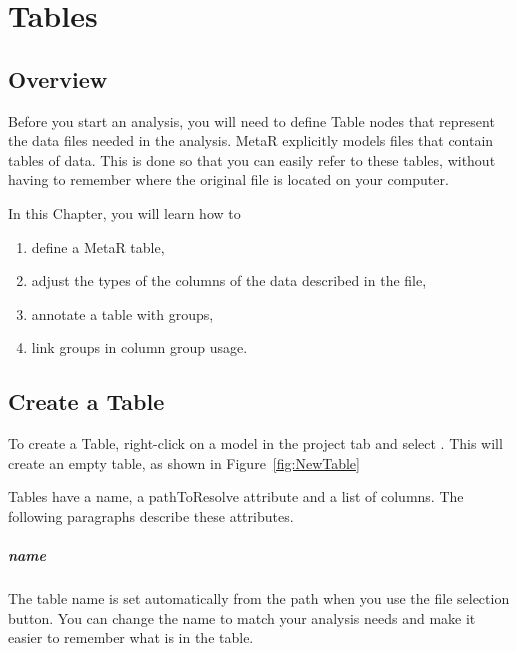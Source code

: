 


\chapter{Tables}\label{chap:Tables}
\section{Overview}
Before you start an analysis, you will need to define Table nodes that represent the data files needed in the analysis. MetaR explicitly models files that contain tables of data. This is done so that you can easily refer to these tables, without having to remember where the original file is located on your computer. 

\noindent In this Chapter, you will learn how to 
\begin{enumerate}
	\item define a MetaR table,
	\item  adjust the types of the columns of the data described in the file,
	\item annotate a table with groups,
	\item link groups in column group usage.
\end{enumerate}

\section{Create a Table}\label{sec:CreateATable}
To create a Table, right-click on a model in the project tab and select . This will create an empty table, as shown in Figure~\ref{fig:NewTable} 

Tables have a name, a pathToResolve attribute and a list of columns. The following paragraphs describe these attributes.
\paragraph{name}
The table name is set automatically from the path when you use the file selection button. You can change the name to match your analysis needs and make it easier to remember what is in the table.
